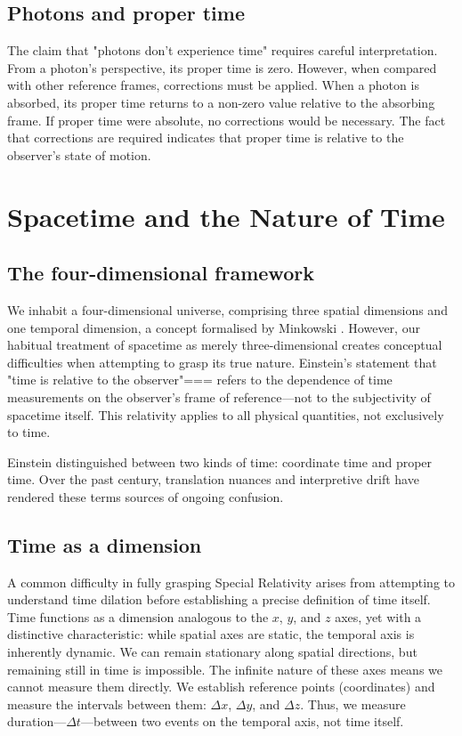 \documentclass[pdflatex,sn-basic]{sn-jnl}
\theoremstyle{thmstyleone}%
\theoremstyle{thmstyletwo}%
\theoremstyle{thmstylethree}%
\begin{document}
	\subsection{Photons and proper time}\label{subsec3_8}
		The claim that "photons don't experience time" requires careful interpretation. From a photon's perspective, its proper time is zero.
However, when compared with other reference frames, corrections must be applied. When a photon is absorbed, its proper time returns to a non-zero value relative to the absorbing frame.
	If proper time were absolute, no corrections would be necessary. The fact that corrections are required indicates that proper time is relative to the observer's state of motion.

\section{Spacetime and the Nature of Time}\label{sec4}
	\subsection{The four-dimensional framework}\label{subsec4_1}
	We inhabit a four-dimensional universe, comprising three spatial dimensions and one temporal dimension, a concept formalised by Minkowski \cite{minkowski1908}. However, our habitual treatment of spacetime as merely three-dimensional creates conceptual difficulties when attempting to grasp its true nature. Einstein's statement that "time is relative to the observer"=== \cite{einstein1905} refers to the dependence of time measurements on the observer's frame of reference—not to the subjectivity of spacetime itself. This relativity applies to all physical quantities, not exclusively to time.

	Einstein distinguished between two kinds of time: coordinate time and proper time. Over the past century, translation nuances and interpretive drift have rendered these terms sources of ongoing confusion.
	\subsection{Time as a dimension}\label{subsec4_2}
	A common difficulty in fully grasping Special Relativity arises from attempting to understand time dilation before establishing a precise definition of time itself. 
	Time functions as a dimension analogous to the $x$, $y$, and $z$ axes, yet with a distinctive characteristic: while spatial axes are static, the temporal axis is inherently dynamic. We can remain stationary along spatial directions, but remaining still in time is impossible.
	The infinite nature of these axes means we cannot measure them directly. We establish reference points (coordinates) and measure the intervals between them: $\Delta x$, $\Delta y$, and $\Delta z$. Thus, we measure duration—$\Delta t$—between two events on the temporal axis, not time itself.
\end{document}
